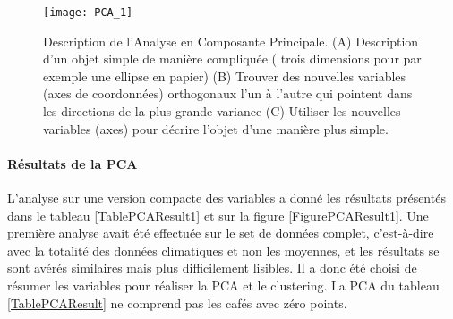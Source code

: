 \begin{figure}[H]
	\texttt{[image: PCA\_1]}
	\caption{\label{PCAdefinition} Description de l'Analyse en Composante Principale. (A) Description d'un objet simple de manière compliquée ( trois dimensions pour par exemple une ellipse en papier) (B) Trouver des nouvelles variables (axes de coordonnées) orthogonaux l'un à l'autre qui pointent dans les directions de la plus grande variance (C) Utiliser les nouvelles variables (axes) pour décrire l'objet d'une manière plus simple. }
\end{figure}

\paragraph{Résultats de la PCA}

L'analyse sur une version compacte des variables a donné les résultats présentés dans le tableau \ref{TablePCAResult1} et sur la figure \ref{FigurePCAResult1}. Une première analyse avait été effectuée sur le set de données complet, c'est-à-dire avec la totalité des données climatiques et non les moyennes, et les résultats se sont avérés similaires mais plus difficilement lisibles. Il a donc été choisi de résumer les variables pour réaliser la PCA et le clustering. La PCA du tableau \ref{TablePCAResult} ne comprend pas les cafés avec zéro points.
